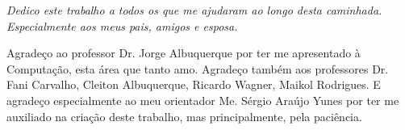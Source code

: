 \documentclass[
	12pt,				%
	openany,			%
	oneside,			%
	a4paper,			%
	english,			%
	brazil				%
	]{{Modelo/abntex2_FBUNI}}
\begin{document}


\frenchspacing 


\imprimircapa

\imprimirfolhaderosto*

\imprimirfolhadeaprovacao

%
%
\cleardoublepage

\begin{dedicatoria}
   \vspace*{\fill}
   \centering
   \noindent
   \textit{
    Dedico este trabalho a todos os que me ajudaram ao longo desta caminhada. Especialmente aos meus pais, amigos e esposa.
   }
   \vspace*{\fill}
\end{dedicatoria}

\begin{agradecimentos}
    Agradeço ao professor Dr. Jorge Albuquerque por ter me apresentado à Computação, esta área que tanto amo. Agradeço também aos professores Dr. Fani Carvalho, Cleiton Albuquerque, Ricardo Wagner, Maikol Rodrigues. E agradeço especialmente ao meu orientador Me. Sérgio Araújo Yunes por ter me auxiliado na criação deste trabalho, mas principalmente, pela paciência.
    
\end{agradecimentos}
\end{document}
